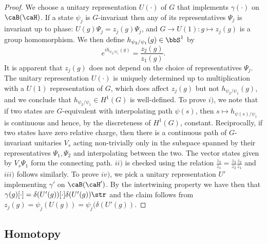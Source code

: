 \begin{proof}
	We choose a unitary representation $U(\cdot)$ of $G$ that implements $\gamma(\cdot)$ on $\caB(\caH)$.  
	If a state $\psi_j$ is $G$-invariant then any of its representatives $\Psi_j$ is invariant up to phase: $U(g)\Psi_j= z_j(g)\Psi_j$, and $G\to U(1): g\mapsto z_j(g)$ is a group homomorphism. We then define $h_{\psi_2/\psi_1}(g)\in\bbS^1$ by
	$$
	e^{ih_{\psi_2/\psi_1}(g)}=\frac{z_2(g)}{z_1(g)}. 
	$$ 
	It is apparent that $z_j(g)$ does not depend on the choice of representatives $\Psi_j$. The unitary representation $U(\cdot)$ is uniquely determined up to multiplication with a $U(1)$ representation of $G$, which does affect $z_j(g)$ but not $h_{\psi_2/\psi_1}(g)$, and we conclude that $h_{\psi_2/\psi_1} \in H^1(G)$ is well-defined. To prove $i)$, we note that if two states are $G$-equivalent with interpolating path $\psi(s)$, then $s\mapsto h_{\psi(s)/\psi_1} $ is continuous and hence, by the discreteness of $H^1(G)$, constant. Reciprocally, if two states have zero relative charge, then there is a continuous path of $G$-invariant unitaries $V_s$ acting non-trivially only in the subspace spanned by their representatives $\Psi_1,\Psi_2$ and interpolating between the two. The vector states given by $V_s\Psi_1$ form the connecting path. $ii)$ is checked using the relation $\frac{z_3}{z_1} = \frac{z_3}{z_2}\frac{z_2}{z_1}$ and $iii)$ follows similarly. To prove $iv)$, we pick a unitary representation $U'$ implementing $\gamma'$ on  $\caB(\caH')$. By the intertwining property we have then that $\gamma(g)[\cdot]=\delta(U'(g))[\cdot]\delta(U'(g))\str$ and the claim follows from $z_j(g) = \psi_j(U(g)) = \psi_j(\delta(U'(g))$.
\end{proof}

\subsection{Homotopy}\label{sec: homotopy}

